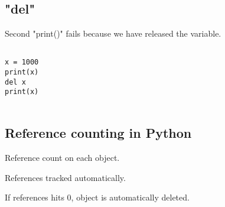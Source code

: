 
\subsection{"del"}

Second "print()" fails because we have released the variable.

\begin{verbatim}

x = 1000
print(x)
del x
print(x)


\end{verbatim}

\subsection{Reference counting in Python}

Reference count on each object.

References tracked automatically.

If references hits \(0\), object is automatically deleted.

